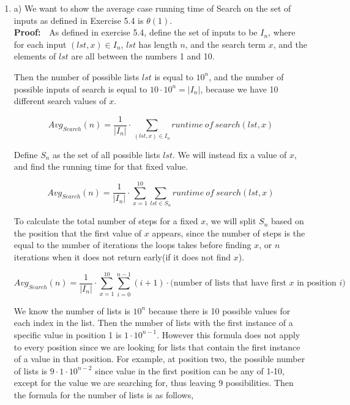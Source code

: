 \documentclass{article}
\begin{document}
\begin{enumerate}
	
	\item a) We want to show the average case running time of Search on the set of inputs as defined in Exercise 5.4 is $\theta (1)$.\\
	\textbf{Proof:}\ \ As defined in exercise 5.4, define the set of inputs to be $I_n$, where for each input $(lst,x) \in I_n$, $lst$ has length $n$, and the search term $x$, and the elements of $lst$ are all between the numbers 1 and 10. 
	
	Then the number of possible lists $lst$ is equal to $10^n$, and the number of possible inputs of search is equal to $10 \cdot 10^n = |I_n|$, because we have 10 different search values of $x$. 
	
	$$ Avg_{Search}(n) = \frac{1}{|I_n|} \cdot \sum_{(lst, x)\in I_n} runtime \ of \ search(lst, x)$$
	
	Define $S_n$ as the set of all possible lists $lst$. We will instead fix a value of $x$, and find the running time for that fixed value. 
	
	$$ Avg_{Search}(n) = \frac{1}{|I_n|} \cdot  \sum_{x=1}^{10} \sum_{lst\in S_n} runtime \ of \ search(lst, x)$$
	
	To calculate the total number of steps for a fixed $x$, we will split $S_n$ based on the position that the first value of $x$ appears, since the number of steps is the equal to the number of iterations the loops takes before finding $x$, or $n$ iterations when it does not return early(if it does not find $x$). 
	
	$$ Avg_{Search}(n) = \frac{1}{|I_n|} \cdot  \sum_{x=1}^{10} \sum_{i = 0}^{n-1} (i +1) \cdot \text{(number of lists that have first $x$ in position $i$)} $$
	
	We know the number of lists is $10^n$ because there is 10 possible values for each index in the list. Then the number of lists with the first instance of a specific value in position 1 is $1 \cdot 10^{n-1}$.  However this formula does not apply to every position since we are looking for lists that contain the first instance of a value in that position. For example, at position two, the possible number of lists is $9 \cdot 1 \cdot 10^{n-2}$ since value in the first position can be any of 1-10, except for the value we are searching for, thus leaving 9 possibilities. Then the formula for the number of lists is as follows, 
	

\end{enumerate}
\end{document}
